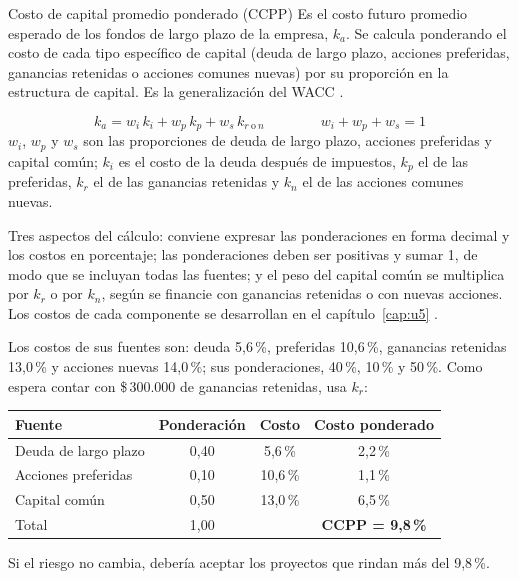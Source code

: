 \begin{definicion}{Costo de capital promedio ponderado (CCPP)}
Es el costo futuro promedio esperado de los fondos de largo plazo de la empresa, $k_a$. Se calcula ponderando el costo de cada tipo específico de capital (deuda de largo plazo, acciones preferidas, ganancias retenidas o acciones comunes nuevas) por su proporción en la estructura de capital. Es la generalización del WACC .
\end{definicion}

\begin{formulaBox}
\[
k_a = w_i\,k_i + w_p\,k_p + w_s\,k_{r\ \text{o}\ n}
\qquad\qquad
w_i + w_p + w_s = 1
\]
$w_i$, $w_p$ y $w_s$ son las proporciones de deuda de largo plazo, acciones preferidas y capital común; $k_i$ es el costo de la deuda después de impuestos, $k_p$ el de las preferidas, $k_r$ el de las ganancias retenidas y $k_n$ el de las acciones comunes nuevas.
\end{formulaBox}

Tres aspectos del cálculo: conviene expresar las ponderaciones en forma decimal y los costos en porcentaje; las ponderaciones deben ser positivas y sumar 1, de modo que se incluyan todas las fuentes; y el peso del capital común se multiplica por $k_r$ o por $k_n$, según se financie con ganancias retenidas o con nuevas acciones. Los costos de cada componente se desarrollan en el capítulo~\ref{cap:u5} .

\begin{ejemplo}
Los costos de sus fuentes son: deuda 5,6\,\%, preferidas 10,6\,\%, ganancias retenidas 13,0\,\% y acciones nuevas 14,0\,\%; sus ponderaciones, 40\,\%, 10\,\% y 50\,\%. Como espera contar con \$\,300.000 de ganancias retenidas, usa $k_r$:
\begin{center}
\begin{tabular}{@{}lccc@{}}
\toprule
Fuente & Ponderación & Costo & Costo ponderado\\
\midrule
Deuda de largo plazo & 0,40 & 5,6\,\% & 2,2\,\%\\
Acciones preferidas & 0,10 & 10,6\,\% & 1,1\,\%\\
Capital común & 0,50 & 13,0\,\% & 6,5\,\%\\
\midrule
Total & 1,00 & & \textbf{CCPP = 9,8\,\%}\\
\bottomrule
\end{tabular}
\end{center}
Si el riesgo no cambia, debería aceptar los proyectos que rindan más del 9,8\,\%.
\end{ejemplo}

